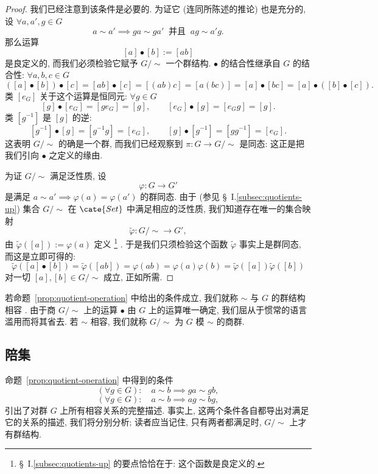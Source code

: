 \begin{proof}
我们已经注意到该条件是必要的. 为证它 (连同所陈述的推论) 也是充分的, 设 $\forall a, a', g \in G$
\[
a \sim a' \implies ga \sim ga' \ \text{ 并且 } \ ag \sim a'g.
\]
那么运算
\[
[a] \bullet [b] := [ab]
\]
是良定义的, 而我们必须检验它赋予 $G/{\sim}$ 一个群结构. $\bullet$ 的结合性继承自 $G$ 的结合性: $\forall a, b, c \in G$
\[
([a] \bullet [b]) \bullet [c] = [ab] \bullet [c] = [(ab)c] = [a(bc)] = [a] \bullet [bc] = [a] \bullet ([b] \bullet [c]).
\]
类 $[e_G]$ 关于这个运算是恒同元: $\forall g \in G$
\[
[g] \bullet [e_G] = [ge_G] = [g], \qquad [e_G] \bullet [g] = [e_G g] = [g].
\]
类 $[g^{-1}]$ 是 $[g]$ 的逆:
\[
[g^{-1}] \bullet [g] = [g^{-1}g] = [e_G], \qquad [g] \bullet [g^{-1}] = [gg^{-1}] = [e_G].
\]
这表明 $G/{\sim}$ 的确是一个群, 而我们已经观察到 $\pi : G \to G/{\sim}$ 是同态: 这正是把我们引向 $\bullet$ 之定义的缘由.

为证 $G/{\sim}$ 满足泛性质, 设
\[
\varphi : G \to G'
\]
是满足 $a \sim a' \implies \varphi(a) = \varphi(a')$ 的群同态. 由于 (参见 \S~I.\ref{subsec:quotients-up}) 集合 $G/{\sim}$ 在 $\cate{Set}$ 中满足相应的泛性质, 我们知道存在唯一的集合映射
\[
\tilde{\varphi} : G/{\sim} \to G',
\]
由 $\tilde{\varphi}([a]) := \varphi(a)$ 定义%
\footnote{\S~I.\ref{subsec:quotients-up} 的要点恰恰在于: 这个函数是良定义的.}%
. 于是我们只须检验这个函数 $\tilde{\varphi}$ 事实上是群同态, 而这是立即可得的:
\[
\tilde{\varphi}([a] \bullet [b]) = \tilde{\varphi}([ab]) = \varphi(ab) = \varphi(a)\varphi(b) = \tilde{\varphi}([a])\tilde{\varphi}([b])
\]
对一切 $[a], [b] \in G/{\sim}$ 成立, 正如所需.
\end{proof}

若命题~\ref{prop:quotient-operation} 中给出的条件成立, 我们就称 $\sim$ 与 $G$ 的群结构相容%
. 由于商 $G/{\sim}$ 上的运算 $\bullet$ 由 $G$ 上的运算唯一确定, 我们屈从于惯常的语言滥用而将其省去. 若 $\sim$ 相容, 我们就称 $G/{\sim}$ 为 $G$ 模 $\sim$ 的商群.

\subsection{陪集}
\label{subsec:cosets}

命题~\ref{prop:quotient-operation} 中得到的条件
\begin{equation*}
(\forall g \in G): \quad a \sim b \implies ga \sim gb, \tag{$\dagger$}
\end{equation*}
\begin{equation*}
(\forall g \in G): \quad a \sim b \implies ag \sim bg, \tag{$\dagger\dagger$}
\end{equation*}
引出了对群 $G$ 上所有相容关系的完整描述. 事实上, 这两个条件各自都导出对满足它的关系的描述, 我们将分别分析; 读者应当记住, 只有两者都满足时, $G/{\sim}$ 上才有群结构.

